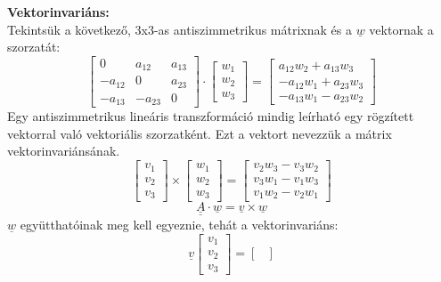 \documentclass[11pt,a4paper]{article}
\begin{document}
    \begin{tcolorbox}[colback=red!5!white,colframe=red!60!black,title= 3. Mátrix vektorinvariánsa és nyoma (trace{,} spur)]
    \textbf{Vektorinvariáns:} \\
    Tekintsük a következő, 3x3-as antiszimmetrikus mátrixnak és a $\underline{w}$ vektornak a szorzatát:
    $$\begin{bmatrix}
        0 & a_{12} & a_{13}\\
        -a_{12} & 0 & a_{23}\\
        -a_{13} & -a_{23} & 0
    \end{bmatrix} \cdot 
    \begin{bmatrix}
        w_1\\
        w_2\\
        w_3
    \end{bmatrix} = 
    \begin{bmatrix}
        a_{12}w_2 + a_{13}w_3\\
        -a_{12}w_1 + a_{23}w_3\\
        -a_{13}w_1 - a_{23}w_2
    \end{bmatrix}$$
    Egy antiszimmetrikus lineáris transzformáció mindig leírható egy rögzített vektorral való vektoriális szorzatként. Ezt a vektort nevezzük a mátrix vektorinvariánsának.
    $$\begin{bmatrix}
        v_1\\
        v_2\\
        v_3
    \end{bmatrix} \times
    \begin{bmatrix}
        w_1\\
        w_2\\
        w_3
    \end{bmatrix} =
    \begin{bmatrix}
        v_2w_3 - v_3w_2\\
        v_3w_1 - v_1w_3\\
        v_1w_2 - v_2w_1
    \end{bmatrix} $$
    $$\underline{\underline{A}} \cdot \underline{w} = \underline{v} \times \underline{w}$$
    $\underline{w}$ együtthatóinak meg kell egyeznie, tehát a vektorinvariáns: \\
    $$\underline{v}
    \begin{bmatrix}
        v_1\\
        v_2\\
        v_3
    \end{bmatrix} = 
    \begin{bmatrix}

\end{bmatrix}$$
\end{tcolorbox}
\end{document}
